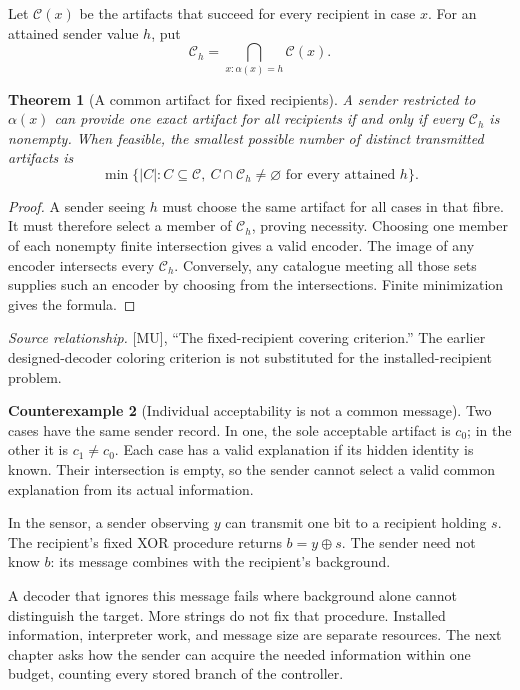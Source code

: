 \documentclass[11pt,oneside,openany]{book}
\newtheorem{theorem}{Theorem}[chapter]
\theoremstyle{definition}\newtheorem{definition}[theorem]{Definition}
\newtheorem{counterexample}[theorem]{Counterexample}
\newcommand{\source}[1]{\par{\small\textit{Source relationship.} #1}\par}
\begin{document}
Let $\mathcal C(x)$ be the artifacts that succeed for every recipient in case $x$. For an attained sender value $h$, put
\[
\mathcal C_h=\bigcap_{x:\alpha(x)=h}\mathcal C(x).
\]

\begin{theorem}[A common artifact for fixed recipients]\label{r:recipient}
A sender restricted to $\alpha(x)$ can provide one exact artifact for all recipients if and only if every $\mathcal C_h$ is nonempty. When feasible, the smallest possible number of distinct transmitted artifacts is
\[
\min\{|C|:C\subseteq\mathcal C,\ C\cap\mathcal C_h\ne\varnothing
\text{ for every attained }h\}.
\]
\end{theorem}
\begin{proof}
A sender seeing $h$ must choose the same artifact for all cases in that fibre. It must therefore select a member of $\mathcal C_h$, proving necessity. Choosing one member of each nonempty finite intersection gives a valid encoder. The image of any encoder intersects every $\mathcal C_h$. Conversely, any catalogue meeting all those sets supplies such an encoder by choosing from the intersections. Finite minimization gives the formula.
\end{proof}
\source{[MU], ``The fixed-recipient covering criterion.'' The earlier designed-decoder coloring criterion is not substituted for the installed-recipient problem.}

\begin{counterexample}[Individual acceptability is not a common message]\label{ce:message}
Two cases have the same sender record. In one, the sole acceptable artifact is $c_0$; in the other it is $c_1\ne c_0$. Each case has a valid explanation if its hidden identity is known. Their intersection is empty, so the sender cannot select a valid common explanation from its actual information.
\end{counterexample}

In the sensor, a sender observing $y$ can transmit one bit to a recipient holding $s$. The recipient's fixed XOR procedure returns $b=y\oplus s$. The sender need not know $b$: its message combines with the recipient's background.

A decoder that ignores this message fails where background alone cannot distinguish the target. More strings do not fix that procedure. Installed information, interpreter work, and message size are separate resources. The next chapter asks how the sender can acquire the needed information within one budget, counting every stored branch of the controller.
\end{document}
